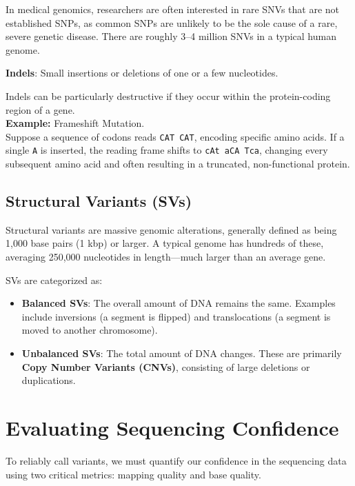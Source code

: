 \sta In medical genomics, researchers are often interested in rare SNVs that are not established SNPs, as common SNPs are unlikely to be the sole cause of a rare, severe genetic disease. There are roughly 3–4 million SNVs in a typical human genome.

\begin{important}
  \textbf{Indels}: Small insertions or deletions of one or a few nucleotides.
\end{important}

Indels can be particularly destructive if they occur within the protein-coding region of a gene. \\
\textbf{Example:} Frameshift Mutation. \\
Suppose a sequence of codons reads \texttt{CAT CAT}, encoding specific amino acids. If a single \texttt{A} is inserted, the reading frame shifts to \texttt{cAt aCA Tca}, changing every subsequent amino acid and often resulting in a truncated, non-functional protein.

\subsection{Structural Variants (SVs)}

Structural variants are massive genomic alterations, generally defined as being 1,000 base pairs (1 kbp) or larger. A typical genome has hundreds of these, averaging 250,000 nucleotides in length—much larger than an average gene.

SVs are categorized as:
\begin{itemize}
    \item \textbf{Balanced SVs}: The overall amount of DNA remains the same. Examples include inversions (a segment is flipped) and translocations (a segment is moved to another chromosome).
    \item \textbf{Unbalanced SVs}: The total amount of DNA changes. These are primarily \textbf{Copy Number Variants (CNVs)}, consisting of large deletions or duplications.
\end{itemize}

\section{Evaluating Sequencing Confidence}

To reliably call variants, we must quantify our confidence in the sequencing data using two critical metrics: mapping quality and base quality.

